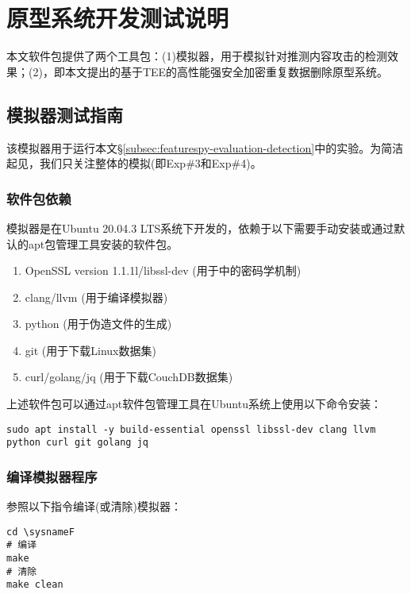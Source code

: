\chapter{原型系统开发测试说明}

本文软件包提供了两个工具包：(1)\sysnameF 模拟器，用于模拟针对推测内容攻击的检测效果；(2)\prototype ，即本文提出的基于TEE的高性能强安全加密重复数据删除原型系统。

\section{\sysnameF 模拟器测试指南}
该模拟器用于运行本文\S\ref{subsec:featurespy-evaluation-detection}中的实验。为简洁起见，我们只关注整体\sysnameF 的模拟(即Exp\#3和Exp\#4)。

\subsection*{软件包依赖}

\sysnameF 模拟器是在Ubuntu 20.04.3 LTS系统下开发的，依赖于以下需要手动安装或通过默认的apt包管理工具安装的软件包。

\begin{enumerate}[leftmargin=0em]
    \item OpenSSL version 1.1.1l/libssl-dev (用于\sysnameF 中的密码学机制)
    \item clang/llvm (用于编译模拟器)
    \item python (用于伪造文件的生成)
    \item git (用于下载Linux数据集)
    \item curl/golang/jq (用于下载CouchDB数据集)
\end{enumerate}

上述软件包可以通过apt软件包管理工具在Ubuntu系统上使用以下命令安装：

\begin{lstlisting}[style=shell]
sudo apt install -y build-essential openssl libssl-dev clang llvm python curl git golang jq
\end{lstlisting}

\subsection*{编译模拟器程序}

参照以下指令编译(或清除)\sysnameF 模拟器：

\begin{lstlisting}[style=shell]
cd \sysnameF
# 编译
make
# 清除
make clean
\end{lstlisting}

